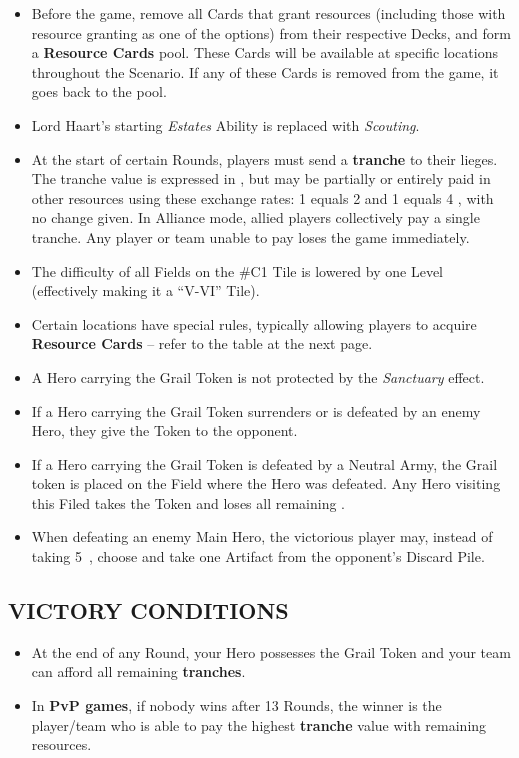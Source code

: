 \begin{multicols*}{2}
\begin{itemize}
  \item Before the game, remove all Cards that grant resources (including those with resource granting as one of the options) from their respective Decks, and form a \textbf{Resource Cards} pool. These Cards will be available at specific locations throughout the Scenario. If any of these Cards is removed from the game, it goes back to the pool.
  \item Lord Haart's starting \textit{Estates} Ability is replaced with \textit{Scouting}.
  \item At the start of certain Rounds, players must send a \textbf{tranche} to their lieges. The tranche value is expressed in , but may be partially or entirely paid in other resources using these exchange rates: 1  equals 2  and 1  equals 4 , with no change given. In Alliance mode, allied players collectively pay a single tranche. Any player or team unable to pay loses the game immediately.
  \item The difficulty of all Fields on the \#C1 Tile is lowered by one Level (effectively making it a ``V-VI'' Tile).
  \item Certain locations have special rules, typically allowing players to acquire \textbf{Resource Cards} -- refer to the table at the next page.
  \item A Hero carrying the Grail Token is not protected by the \textit{Sanctuary} effect.
  \item If a Hero carrying the Grail Token surrenders or is defeated by an enemy Hero, they give the Token to the opponent.
  \item If a Hero carrying the Grail Token is defeated by a Neutral Army, the Grail token is placed on the Field where the Hero was defeated. Any Hero visiting this Filed takes the Token and loses all remaining .
  \item When defeating an enemy Main Hero, the victorious player may, instead of taking \mbox{5 }, choose and take one Artifact from the opponent's Discard Pile.
\end{itemize}

\subsection*{\MakeUppercase{Victory Conditions}}

\begin{itemize}
  \item At the end of any Round, your Hero possesses the Grail Token and your team can afford all remaining \textbf{tranches}.
  \item In \textbf{PvP games}, if nobody wins after 13 Rounds, the winner is the player/team who is able to pay the highest \textbf{tranche} value with remaining resources.
\end{itemize}


\end{multicols*}

